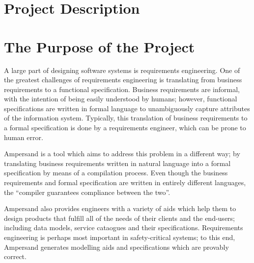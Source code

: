 \documentclass[12pt]{report}
\begin{document}
{\section{Project Description}\label{sec:Intro}}
{\section{The Purpose of the Project}\label{sec:Purpose}}
A large part of designing software systems is requirements engineering. One
of the greatest challenges of requirements engineering is translating from
business requirements to a functional specification. Business requirements are
informal, with the intention of being easily understood by humans; however,
functional specifications are written in formal language to unambiguously capture attributes of the 
information system. Typically, this translation
of business requirements to a formal specification is done by a requirements
engineer, which can be prone to human error.

Ampersand is a tool which aims to address this problem in a different way; by
translating business requirements written in natural language into a formal
specification by means of a compilation process. %
%
%
Even though the business requirements and formal specification are written in
entirely different languages, the ``compiler guarantees compliance between the two''. %

Ampersand also provides engineers with a variety of aids which
help them to design products that fulfill all of the needs of their clients and
the end-users; including data models, service cataogues and their
specifications. Requirements engineering is perhaps most important in
safety-critical systems; to this end, Ampersand generates modelling aids and
specifications which are provably correct. %
\end{document}
